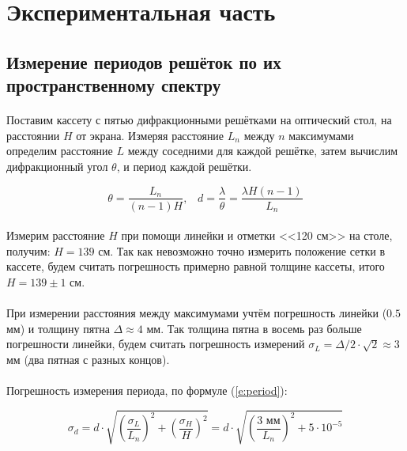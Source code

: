 \documentclass[a4paper,12pt]{article} %
\begin{document}
\section{Экспериментальная часть}

\subsection{Измерение периодов решёток по их пространственному спектру}

\paragraph{} Поставим кассету с пятью дифракционными решётками на оптический стол, на расстоянии $H$ от экрана. Измеряя расстояние $L_n$ между $n$ максимумами определим расстояние $L$ между соседними для каждой решётке, затем вычислим дифракционный угол $\theta$, и период каждой решётки.

\begin{equation}
\theta = \frac{L_n}{(n - 1) H}, \;\;\; d = \frac{\lambda}{\theta} = \frac{\lambda H (n - 1)}{L_n}
\label{e:period}
\end{equation}


\paragraph{} Измерим расстояние $H$ при помощи линейки и отметки <<120 см>> на столе, получим: $H = 139$ см. Так как невозможно точно измерить положение сетки в кассете, будем считать погрешность примерно равной толщине кассеты, итого $H = 139 \pm 1$ см.

\paragraph{} При измерении расстояния между максимумами учтём погрешность линейки ($0.5$ мм) и толщину пятна $\Delta \approx 4$ мм. Так толщина пятна в восемь раз больше погрешности линейки, будем считать погрешность измерений $\sigma_L = \Delta / 2 \cdot \sqrt{2} \approx 3$ мм (два пятная с разных концов).

\paragraph{} Погрешность измерения периода, по формуле (\ref{e:period}):

\[
\sigma_d = d \cdot \sqrt{\left( \frac{\sigma_L}{L_n} \right) ^ 2 + \left( \frac{\sigma_H}{H} \right) ^ 2} = d \cdot \sqrt{\left( \frac{3 \text{ мм}}{L_n} \right) ^ 2 + 5 \cdot 10^{-5}}
\]
\end{document}
